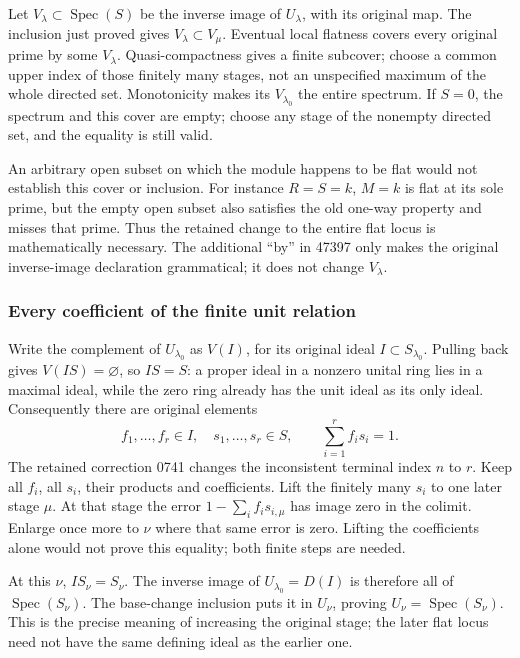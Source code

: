 Let \(V_\lambda\subset\operatorname{Spec}(S)\) be the inverse image of \(U_\lambda\), with its original map. The inclusion just proved gives \(V_\lambda\subset V_\mu\). Eventual local flatness covers every original prime by some \(V_\lambda\). Quasi-compactness gives a finite subcover; choose a common upper index of those finitely many stages, not an unspecified maximum of the whole directed set. Monotonicity makes its \(V_{\lambda_0}\) the entire spectrum. If \(S=0\), the spectrum and this cover are empty; choose any stage of the nonempty directed set, and the equality is still valid.

An arbitrary open subset on which the module happens to be flat would not establish this cover or inclusion. For instance \(R=S=k\), \(M=k\) is flat at its sole prime, but the empty open subset also satisfies the old one-way property and misses that prime. Thus the retained change to the entire flat locus is mathematically necessary. The additional ``by'' in 47397 only makes the original inverse-image declaration grammatical; it does not change \(V_\lambda\).

\subsubsection{Every coefficient of the finite unit relation}\label{algebra-proof-072-every-coefficient-of-the-finite-unit-relation}

Write the complement of \(U_{\lambda_0}\) as \(V(I)\), for its original ideal \(I\subset S_{\lambda_0}\). Pulling back gives \(V(IS)=\varnothing\), so \(IS=S\): a proper ideal in a nonzero unital ring lies in a maximal ideal, while the zero ring already has the unit ideal as its only ideal. Consequently there are original elements \[
 f_1,\ldots,f_r\in I,\quad s_1,\ldots,s_r\in S,
 \qquad\sum_{i=1}^r f_i s_i=1.
\] The retained correction 0741 changes the inconsistent terminal index \(n\) to \(r\). Keep all \(f_i\), all \(s_i\), their products and coefficients. Lift the finitely many \(s_i\) to one later stage \(\mu\). At that stage the error \(1-\sum_i f_i s_{i,\mu}\) has image zero in the colimit. Enlarge once more to \(\nu\) where that same error is zero. Lifting the coefficients alone would not prove this equality; both finite steps are needed.

At this \(\nu\), \(IS_\nu=S_\nu\). The inverse image of \(U_{\lambda_0}=D(I)\) is therefore all of \(\operatorname{Spec}(S_\nu)\). The base-change inclusion puts it in \(U_\nu\), proving \(U_\nu=\operatorname{Spec}(S_\nu)\). This is the precise meaning of increasing the original stage; the later flat locus need not have the same defining ideal as the earlier one.

